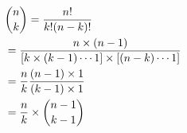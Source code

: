 \documentclass[preview]{standalone}
\begin{document}
\begin{align*}
& {n \choose k} = { {n!} \over {k! (n-k)!} } \\ &= { n \times (n-1) \over { [ k \times (k-1) \cdots 1] \times  [(n-k) \cdots 1] } } \\ &= { n \over k } { (n-1) \times 1 \over (k-1) \times 1 }\\ & = { n \over k } \times { {n-1} \choose {k-1} }
\end{align*}
\end{document}
